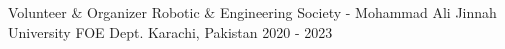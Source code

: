 \begin{cventries}
\cventry
{Volunteer \& Organizer} %
{Robotic \& Engineering Society - Mohammad Ali Jinnah University FOE Dept.} %
{Karachi, Pakistan} %
{\vspace{-0.5em} 2020 - 2023} %
{
}
\vspace{-2em}
\end{cventries}
